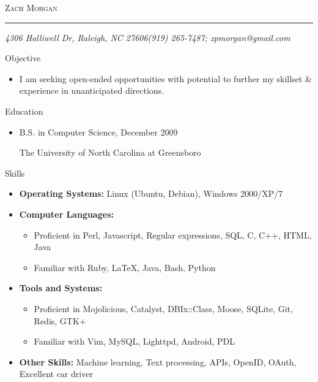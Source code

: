 \documentclass[11pt,oneside]{article}
\makeatletter
\newcommand{\name}{Zach Morgan}
\newcommand{\addr}{4306 Halliwell Dr, Raleigh, NC 27606}
\newcommand{\phone}{(919) 265-7487}
\newcommand{\email}{zpmorgan@gmail.com}
\newcommand{\bigname}[1]{
	\begin{center}\fontfamily{phv}\selectfont\Huge\scshape#1\end{center}
}
\newenvironment{ressection}[1]{
	\vspace{2pt}
	{\fontfamily{phv}\selectfont\Large#1}
	\begin{itemize}
	\vspace{3pt}
}{
	\end{itemize}
}
\newcommand{\resitem}[1]{
	\vspace{-4pt}
	\item \begin{flushleft} #1 \end{flushleft}
}
\newcommand{\ressubitem}[1]{
	\vspace{-1pt}
	\item \begin{flushleft} #1 \end{flushleft}
}
\newenvironment{reslist}[1]{
	\resitem{\textbf{#1}}
	\vspace{-5pt}
	\begin{itemize}
}{
	\end{itemize}
}
\makeatother
\begin{document}
 \selectfont

\bigname{\name}

\vspace{-8pt} \rule{\textwidth}{1pt}

\vspace{-1pt} {\small\itshape \addr \hfill \phone; \email}

\vspace{8 pt}




\begin{ressection}{Objective}

   \resitem{I am seeking open-ended opportunities with potential to further my skillset \& experience in unanticipated directions.}
	
\end{ressection}


\begin{ressection}{Education}

	\resitem{B.S. in Computer Science, December 2009}{The University of North Carolina at Greensboro}

\end{ressection}


\begin{ressection}{Skills}

	\resitem{\textbf{Operating Systems:} Linux (Ubuntu, Debian), Windows 2000/XP/7}

	\begin{reslist}{Computer Languages:}

		\ressubitem{Proficient in Perl, Javascript, Regular expressions, SQL, C, C++, HTML, Java}

		\ressubitem{Familiar with Ruby, \LaTeX, Java, Bash, Python}

	\end{reslist}

	\begin{reslist}{Tools and Systems:}

		\ressubitem{Proficient in Mojolicious, Catalyst, DBIx::Class, Moose, SQLite, Git, Redis, GTK+}

    \ressubitem{Familiar with Vim, MySQL, Lighttpd, Android, PDL}

	\end{reslist}

  \resitem{\textbf{Other Skills:}
    Machine learning, Text processing, APIs, OpenID, OAuth, Excellent car driver}

\end{ressection}
\end{document}
